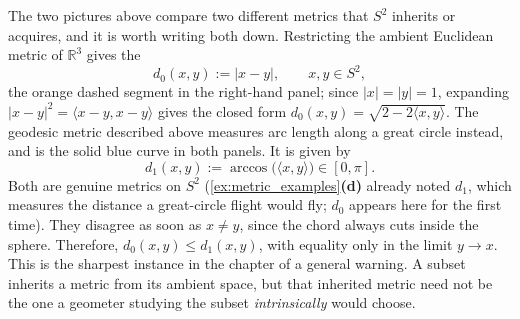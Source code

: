 \begin{remark}
\label{rem:sphere_two_metrics}
The two pictures above compare two different metrics that $S^2$ inherits or acquires, and it is
worth writing both down. Restricting the ambient Euclidean metric of $\mathbb{R}^3$ gives the
\[d_0(x,y) := |x-y|, \qquad x,y \in S^2,\]
the orange dashed segment in the right-hand panel; since $|x|=|y|=1$, expanding
$|x-y|^2 = \langle x-y,x-y\rangle$ gives the closed form
$d_0(x,y) = \sqrt{2-2\langle x,y\rangle}$. The geodesic metric described above measures arc length
along a great circle instead, and is the solid blue curve in both panels. It is given by
\[d_1(x,y) := \arccos\big(\langle x,y\rangle\big) \in [0,\pi].\]
Both are genuine metrics on $S^2$ (\cref{ex:metric_examples}\textbf{(d)} already noted $d_1$,
which measures the distance a great-circle flight would fly; $d_0$ appears here for the first
time). They disagree as soon as
$x \neq y$, since the chord always cuts inside the sphere. Therefore, $d_0(x,y) \leq d_1(x,y)$,
with equality only in the limit $y \to x$. This is the sharpest instance in the chapter of a
general warning. A subset inherits a metric from its ambient space, but that inherited metric need
not be the one a geometer studying the subset \emph{intrinsically} would choose.
\end{remark}

